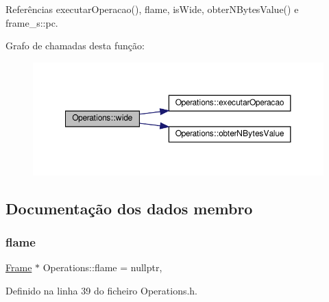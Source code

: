 Referências executar\+Operacao(), flame, is\+Wide, obter\+N\+Bytes\+Value() e frame\+\_\+s\+::pc.

Grafo de chamadas desta função\+:
\nopagebreak
\begin{figure}[H]
\begin{center}
\leavevmode
\includegraphics[width=350pt]{classOperations_ab1474dfc4eb5142361b00d185f0a4a2b_cgraph}
\end{center}
\end{figure}


\subsection{Documentação dos dados membro}
\mbox{\label{classOperations_a578012ad7aafe27db149c6e421bef1a6}} 
\subsubsection{\texorpdfstring{flame}{flame}}
{\footnotesize\ttfamily \hyperlink{Frame_8h_acc380914b41a084dcc8e4b38fb200145}{Frame} $\ast$ Operations\+::flame = nullptr\hspace{0.3cm}{\ttfamily [static]}, {\ttfamily [private]}}



Definido na linha 39 do ficheiro Operations.\+h.



